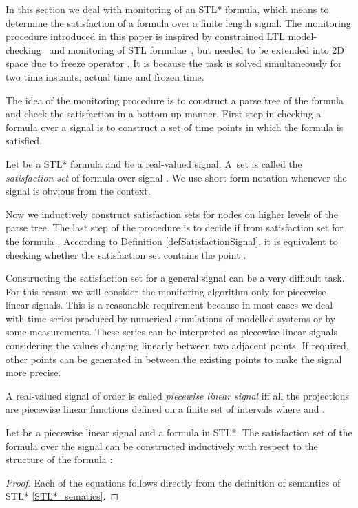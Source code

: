 \label{sec:algorithm}

In this section we deal with monitoring of an STL* formula, which means to determine the satisfaction of a formula over a finite length signal. 
The monitoring procedure introduced in this paper is inspired by constrained LTL model-checking~\cite{Calzone} and monitoring of STL formulae~\cite{Maler_STL}, but needed to be extended into 2D space due to freeze operator . It is because the task is solved simultaneously for two time instants, actual time and frozen time.

The idea of the monitoring procedure is to construct a parse tree of the formula and check the satisfaction in a bottom-up manner. First step in checking a formula  over a signal  is to construct a set of time points in which the formula  is satisfied.

\begin{definition}
	Let  be a STL* formula and  be a real-valued signal. A~set  is called the \emph{satisfaction set} of formula  over signal . We use short-form notation  whenever the signal  is obvious from the context.
\end{definition}

Now we inductively construct satisfaction sets for nodes on higher levels of the parse tree. The last step of the procedure is to decide if  from satisfaction set for the formula . According to Definition \ref{defSatisfactionSignal}, it is equivalent to checking whether the satisfaction set contains the point .

Constructing the satisfaction set for a general signal can be a very difficult task. For this reason we will consider the monitoring algorithm only for piecewise linear signals. This is a reasonable requirement because in most cases we deal with time series produced by numerical simulations of modelled systems or by some measurements. These series can be interpreted as piecewise linear signals considering the values changing linearly between two adjacent points. If required, other points can be generated in between the existing points to make the signal more precise. 


\begin{definition}
	A real-valued signal  of order  is called \emph{piecewise linear signal} iff all the projections  are piecewise linear functions defined on a finite set of intervals  where  and .
\end{definition}

\begin{theorem}
	\label{monitoring_STL*}
	Let  be a piecewise linear signal and  a formula in STL*. The satisfaction set  of the formula  over the signal  can be constructed inductively with respect to the structure of the formula :       
	

	\begin{proof}
		Each of the equations follows directly from the definition of semantics of STL* \eqref{STL*_sematics}.
	\end{proof}
\end{theorem}

